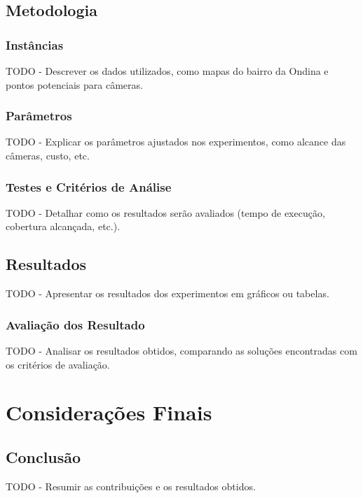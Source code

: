 \documentclass[12pt, a4paper]{report}
\begin{document}
\section{Metodologia}
\subsection{Instâncias}
TODO - Descrever os dados utilizados, como mapas do bairro da Ondina e pontos potenciais para câmeras.

\subsection{Parâmetros}
TODO - Explicar os parâmetros ajustados nos experimentos, como alcance das câmeras, custo, etc.

\subsection{Testes e Critérios de Análise}
TODO - Detalhar como os resultados serão avaliados (tempo de execução, cobertura alcançada, etc.).

\section{Resultados}
TODO - Apresentar os resultados dos experimentos em gráficos ou tabelas.

\subsection{Avaliação dos Resultado~}
TODO - Analisar os resultados obtidos, comparando as soluções encontradas com os critérios de avaliação.

\chapter{Considerações Finais}

\section{Conclusão}
TODO - Resumir as contribuições e os resultados obtidos.

\newpage
\renewcommand{\refname}{Referências Bibliográficas}

\nocite{*}
\end{document}
